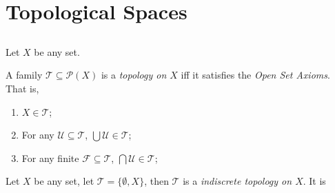 
\chapter{Topological Spaces}


\section{}


\begin{definition}
	\label{def: topological space}
	
	Let $X$ be any set.
	
	A family $\mathcal T \subseteq \mathcal P(X)$ is a \textit{topology on $X$} iff it satisfies the \textit{Open Set Axioms}. That is,
	\begin{enumerate}
		\item
		\label{def: open set axiom: necessary elements}
		$X \in \mathcal T$;
		
		\item
		\label{def: open set axiom: closed under arbitrary union}
		For any $\mathcal U \subseteq \mathcal T$, $\bigcup \mathcal U \in \mathcal T$;
		
		\item
		\label{def: open set axiom: closed under finite intersection}
		For any finite $\mathcal F \subseteq \mathcal T$, $\bigcap \mathcal U \in \mathcal T$;
	\end{enumerate}
\end{definition}


\begin{example}
	Let $X$ be any set, let $\mathcal T = \{ \emptyset, X \}$, then $\mathcal T$ is a \textit{indiscrete topology on $X$}. It is
\end{example}




















%